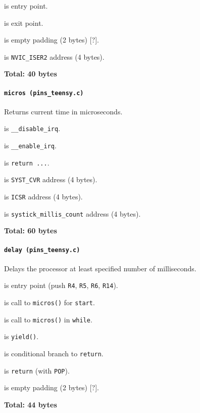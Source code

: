  is entry point.

 is exit point.

 is empty padding (2 bytes) [?].

 is \texttt{NVIC\_ISER2} address (4 bytes).

\textbf{Total: 40 bytes}

\paragraph{\texttt{micros (pins\_teensy.c)}} Returns current time in
microseconds.

 is \texttt{\_\_disable\_irq}.

 is \texttt{\_\_enable\_irq}.

 is \texttt{return ...}.

\vspace{1em}

 is \texttt{SYST\_CVR} address (4 bytes).

 is \texttt{ICSR} address (4 bytes).

 is \texttt{systick\_millis\_count} address (4 bytes).

\textbf{Total: 60 bytes}

\paragraph{\texttt{delay (pins\_teensy.c)}} Delays the processor at least
specified number of milliseconds.

 is entry point (push \texttt{R4}, \texttt{R5},
\texttt{R6}, \texttt{R14}).

 is call to \texttt{micros()} for \texttt{start}.

 is call to \texttt{micros()} in \texttt{while}.

 is \texttt{yield()}.

 is conditional branch to \texttt{return}.

 is \texttt{return} (with \texttt{POP}).

 is empty padding (2 bytes) [?].

\textbf{Total: 44 bytes}

